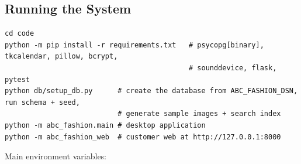 \hypertarget{sec:impl-run}{%
\subsection{Running the System}\label{sec:impl-run}}

\begin{lstlisting}[numbers=none]
cd code
python -m pip install -r requirements.txt   # psycopg[binary], tkcalendar, pillow, bcrypt,
                                            # sounddevice, flask, pytest
python db/setup_db.py      # create the database from ABC_FASHION_DSN, run schema + seed,
                           # generate sample images + search index
python -m abc_fashion.main # desktop application
python -m abc_fashion_web  # customer web at http://127.0.0.1:8000
\end{lstlisting}

Main environment variables:

